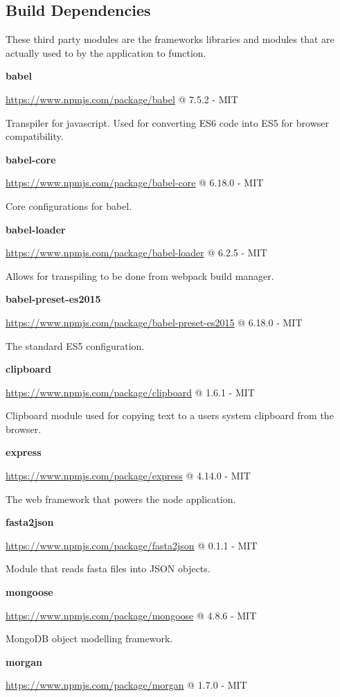 \subsection{Build Dependencies}
  These third party modules are the frameworks libraries and modules that are actually used to by the application to function. 

  \textbf{babel}

  \url{https://www.npmjs.com/package/babel} @ 7.5.2 - MIT

  Transpiler for javascript. Used for converting ES6 code into ES5 for browser compatibility.

  \textbf{babel-core}

  \url{https://www.npmjs.com/package/babel-core} @ 6.18.0 - MIT

  Core configurations for babel.

    
  \textbf{babel-loader}

  \url{https://www.npmjs.com/package/babel-loader} @ 6.2.5 - MIT

  Allows for transpiling to be done from webpack build manager.

  \textbf{babel-preset-es2015}

  \url{https://www.npmjs.com/package/babel-preset-es2015} @ 6.18.0 - MIT

  The standard ES5 configuration.

  \textbf{clipboard}

  \url{https://www.npmjs.com/package/clipboard} @ 1.6.1 - MIT

  Clipboard module used for copying text to a users system clipboard from the browser.


  \textbf{express}

  \url{https://www.npmjs.com/package/express} @ 4.14.0 - MIT

  The web framework that powers the node application.

  \textbf{fasta2json}

  \url{https://www.npmjs.com/package/fasta2json} @ 0.1.1 - MIT

  Module that reads fasta files into JSON objects.

  \textbf{mongoose}

  \url{https://www.npmjs.com/package/mongoose} @ 4.8.6 - MIT

  MongoDB object modelling framework.

  \textbf{morgan}

  \url{https://www.npmjs.com/package/morgan} @ 1.7.0 - MIT

